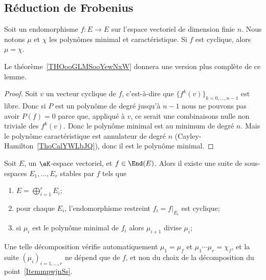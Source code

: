 \subsection{Réduction de Frobenius}

\begin{lemma}       \label{LEMooKUQDooKFeIYq}
	Soit un endomorphisme \( f\colon E\to E\) sur l'espace vectoriel de dimension finie \( n\). Nous notons \( \mu\) et \( \chi\) les polynômes minimal et caractéristique. Si \( f\) est cyclique, alors \( \mu=\chi\).
\end{lemma}
Le théorème~\ref{THOooGLMSooYewNxW} donnera une version plus complète de ce lemme.

\begin{proof}
	Soit \( v\) un vecteur cyclique de \( f\), c'est-à-dire que \( \{ f^k(v) \}_{k=0,\ldots, n-1}\) est libre. Donc si \( P\) est un polynôme de degré jusqu'à \( n-1\) nous ne pouvons pas avoir \( P(f)=0\) parce que, appliqué à \( v\), ce serait une combinaisons nulle non triviale des \( f^k(v)\). Donc le polynôme minimal est au minimum de degré \( n\). Mais le polynôme caractéristique est annulateur de degré \( n\) (Cayley-Hamilton~\ref{ThoCalYWLbJQ}), donc il est le polynôme minimal.
\end{proof}

\begin{theorem}        \label{THOooDOWUooOzxzxm}
	Soit \( E\), un \( \eK\)-espace vectoriel, et \( f\in \End(E)\). Alors il existe une suite de sous-espaces \( E_1,\ldots, E_r\) stables par \( f\) tels que
	\begin{enumerate}
		\item   \label{ItemmpwjnSs}
		      \( E=\bigoplus_{i=1}^rE_i\);
		\item
		      pour chaque \( E_i\), l'endomorphisme restreint \( f_i=f|_{E_i}\) est cyclique;
		\item
		      si \( \mu_i\) est le polynôme minimal de \( f_i\) alors \( \mu_{i+1}\) divise \( \mu_i\);
	\end{enumerate}
	Une telle décomposition vérifie automatiquement \( \mu_1=\mu_f\) et \( \mu_1\cdots \mu_r=\chi_f\), et la suite \( (\mu_i)_{i=1,\ldots, r}\) ne dépend que de \( f\), et non du choix de la décomposition du point~\ref{ItemmpwjnSs}.
\end{theorem}

